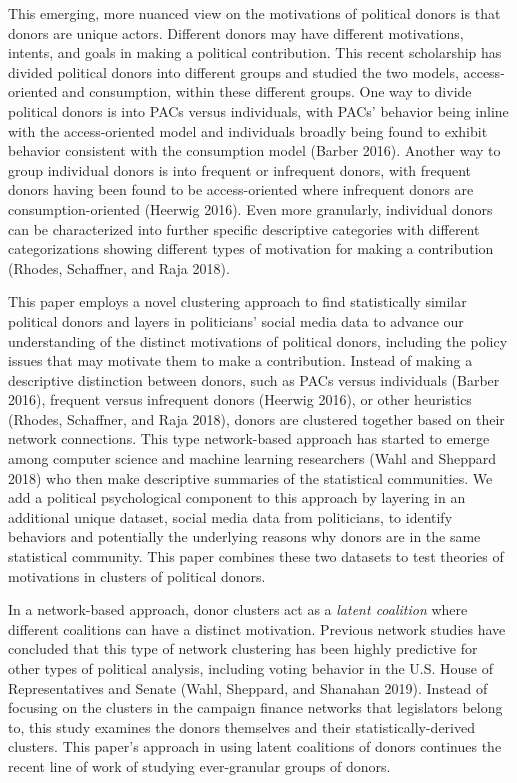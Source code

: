 \documentclass[12pt,]{article}
\begin{document}
This emerging, more nuanced view on the motivations of political donors
is that donors are unique actors. Different donors may have different
motivations, intents, and goals in making a political contribution. This
recent scholarship has divided political donors into different groups
and studied the two models, access-oriented and consumption, within
these different groups. One way to divide political donors is into PACs
versus individuals, with PACs' behavior being inline with the
access-oriented model and individuals broadly being found to exhibit
behavior consistent with the consumption model (Barber 2016). Another
way to group individual donors is into frequent or infrequent donors,
with frequent donors having been found to be access-oriented where
infrequent donors are consumption-oriented (Heerwig 2016). Even more
granularly, individual donors can be characterized into further specific
descriptive categories with different categorizations showing different
types of motivation for making a contribution (Rhodes, Schaffner, and
Raja 2018).

This paper employs a novel clustering approach to find statistically
similar political donors and layers in politicians' social media data to
advance our understanding of the distinct motivations of political
donors, including the policy issues that may motivate them to make a
contribution. Instead of making a descriptive distinction between
donors, such as PACs versus individuals (Barber 2016), frequent versus
infrequent donors (Heerwig 2016), or other heuristics (Rhodes,
Schaffner, and Raja 2018), donors are clustered together based on their
network connections. This type network-based approach has started to
emerge among computer science and machine learning researchers (Wahl and
Sheppard 2018) who then make descriptive summaries of the statistical
communities. We add a political psychological component to this approach
by layering in an additional unique dataset, social media data from
politicians, to identify behaviors and potentially the underlying
reasons why donors are in the same statistical community. This paper
combines these two datasets to test theories of motivations in clusters
of political donors.

In a network-based approach, donor clusters act as a \emph{latent
coalition} where different coalitions can have a distinct motivation.
Previous network studies have concluded that this type of network
clustering has been highly predictive for other types of political
analysis, including voting behavior in the U.S. House of Representatives
and Senate (Wahl, Sheppard, and Shanahan 2019). Instead of focusing on
the clusters in the campaign finance networks that legislators belong
to, this study examines the donors themselves and their
statistically-derived clusters. This paper's approach in using latent
coalitions of donors continues the recent line of work of studying
ever-granular groups of donors.
\end{document}

